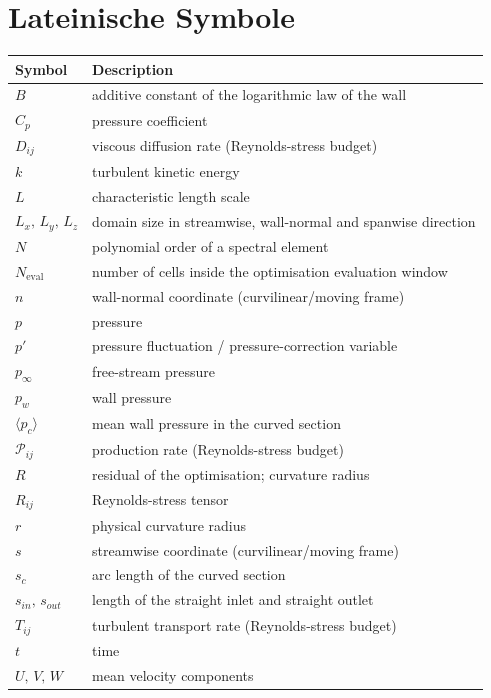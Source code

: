 \section*{Lateinische Symbole}
\fi
\begin{longtable}[t]{@{}p{}p{}@{}}
    \textbf{Symbol} & \textbf{Description}\\
    \midrule
    \endhead
    $B$ & additive constant of the logarithmic law of the wall \\
    $C_p$ & pressure coefficient \\
    $D_{ij}$ & viscous diffusion rate (Reynolds-stress budget) \\
    $k$ & turbulent kinetic energy \\
    $L$ & characteristic length scale \\
    $L_x,\,L_y,\,L_z$ & domain size in streamwise, wall-normal and spanwise direction \\
    $N$ & polynomial order of a spectral element \\
    $N_{\mathrm{eval}}$ & number of cells inside the optimisation evaluation window \\
    $n$ & wall-normal coordinate (curvilinear/moving frame) \\
    $p$ & pressure \\
    $p'$ & pressure fluctuation / pressure-correction variable \\
    $p_{\infty}$ & free-stream pressure \\
    $p_w$ & wall pressure \\
    $\langle p_c\rangle$ & mean wall pressure in the curved section \\
    $\mathcal{P}_{ij}$ & production rate (Reynolds-stress budget) \\
    $R$ & residual of the optimisation; curvature radius \\
    $R_{ij}$ & Reynolds-stress tensor \\
    $r$ & physical curvature radius \\
    $s$ & streamwise coordinate (curvilinear/moving frame) \\
    $s_{c}$ & arc length of the curved section \\
    $s_{in},\,s_{out}$ & length of the straight inlet and straight outlet \\
    $T_{ij}$ & turbulent transport rate (Reynolds-stress budget) \\
    $t$ & time \\
    $U,\,V,\,W$ & mean velocity components \\

\end{longtable}

